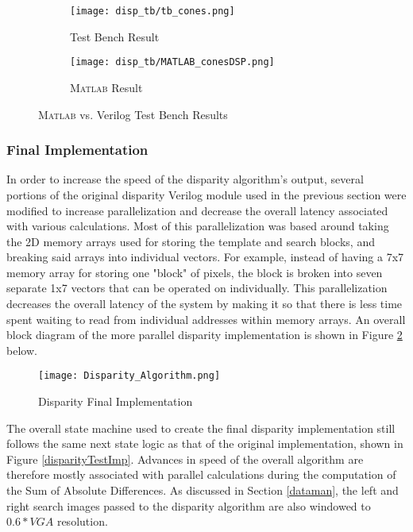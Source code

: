\par
\begin{figure}[H] 
         \begin{subfigure}[h]{0.5\textwidth}
              \centerline{\texttt{[image: disp\_tb/tb\_cones.png]}}
             \caption{Test Bench Result}
         \end{subfigure}
         \begin{subfigure}[h]{0.5\textwidth}
             \centerline{\texttt{[image: disp\_tb/MATLAB\_conesDSP.png]}}
             \caption{\textsc{Matlab} Result}
         \end{subfigure}
\caption{\textsc{Matlab} vs. Verilog Test Bench Results}
\label{disparityVerilogvsMatlab}
\end{figure}


\subsubsection{Final Implementation}
In order to increase the speed of the disparity algorithm's output, several portions of the original disparity Verilog module used in the previous section were modified to increase parallelization and decrease the overall latency associated with various calculations. Most of this parallelization was based around taking the 2D memory arrays used for storing the template and search blocks, and breaking said arrays into individual vectors. For example, instead of having a 7x7 memory array for storing one "block" of pixels, the block is broken into seven separate 1x7 vectors that can be operated on individually. This parallelization decreases the overall latency of the system by making it so that there is less time spent waiting to read from individual addresses within memory arrays. An overall block diagram of the more parallel disparity implementation is shown in Figure \ref{disparityFinalImp} below. 
\par
\begin{figure}[H]
	\centerline{\texttt{[image: Disparity\_Algorithm.png]}}
	\caption{Disparity Final Implementation}
	\label{disparityFinalImp}
\end{figure}
\par
The overall state machine used to create the final disparity implementation still follows the same next state logic as that of the original implementation, shown in Figure \ref{disparityTestImp}. Advances in speed of the overall algorithm are therefore mostly associated with parallel calculations during the computation of the Sum of Absolute Differences. As discussed in Section \ref{dataman}, the left and right search images passed to the disparity algorithm are also windowed to $0.6*VGA$ resolution. 
